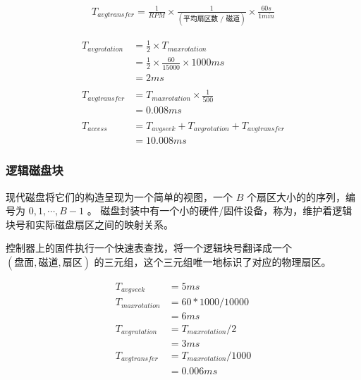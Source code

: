 {{{\begin{description}
{                    \begin{align*}
                        T_{avg transfer} = \frac{1}{RPM} \times \frac{1}{(\text{平均扇区数 / 磁道})} \times \frac{60s}{1min}
                    \end{align*}
                }
            \end{description}

            \begin{practicec}
                \begin{align*}
                    T_{avg rotation}
                    &= \frac{1}{2} \times T_{max rotation} \\
                    &= \frac{1}{2} \times \frac{60}{15000} \times 1000ms \\
                    &= 2ms \\
                    \\
                    T_{avg transfer}
                    &= T_{max rotation} \times \frac{1}{500} \\
                    &= 0.008ms \\
                    \\
                    T_{access}
                    &= T_{avg seek} + T_{avg rotation} + T_{avg transfer} \\
                    &= 10.008ms
                \end{align*}
            \end{practicec}
        }

        \subsubsection{逻辑磁盘块}
        {
            现代磁盘将它们的构造呈现为一个简单的视图，一个 $B$ 个扇区大小的的序列，编号为 $0, 1, \cdots, B - 1$ 。
            磁盘封装中有一个小的硬件/固件设备，称为，维护着逻辑块号和实际磁盘扇区之间的映射关系。

            控制器上的固件执行一个快速表查找，将一个逻辑块号翻译成一个 $(\text{盘面}, \text{磁道}, \text{扇区})$ 的三元组，这个三元组唯一地标识了对应的物理扇区。

            \begin{practicec}
                \begin{align*}
                    T_{avg seek} &= 5ms \\
                    T_{max rotation} &= 60 * 1000 / 10000 \\
                    &= 6ms \\
                    T_{avg ratation} &= T_{max rotation} / 2 \\
                    &= 3ms \\
                    T_{avg transfer} &= T_{max rotation} / 1000 \\
                    &= 0.006ms
                \end{align*}


\end{practicec}}}}
